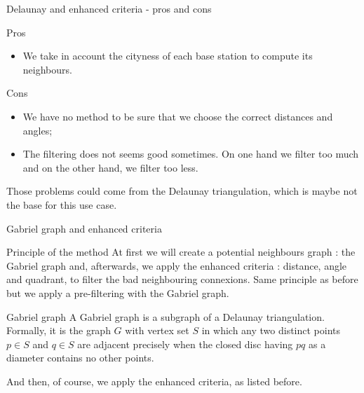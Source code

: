 \begin{frame}{Delaunay and enhanced criteria - pros and cons}
    \begin{block}{Pros}
        \begin{itemize}
            \item We take in account the \og cityness\fg{} of each base station to compute its neighbours.
        \end{itemize}
    \end{block}

    \begin{block}{Cons}
        \begin{itemize}
            \item We have no method to be sure that we choose the correct distances and angles;
            \item The filtering does not seems good sometimes. On one hand we filter too much and on the other hand, we filter too less.
        \end{itemize}
    \end{block}

    Those problems could come from the Delaunay triangulation, which is maybe not the base for this use case.
\end{frame}

\begin{frame}{Gabriel graph and enhanced criteria}
    \begin{block}{Principle of the method}
        At first we will create a potential neighbours graph : the Gabriel graph and, afterwards, we apply the enhanced criteria : distance, angle and quadrant,
        to filter the bad neighbouring connexions. Same principle as before but we apply a pre-filtering with the Gabriel graph.
    \end{block}

    \begin{block}{Gabriel graph\footnotemark}
        A Gabriel graph is a subgraph of a Delaunay triangulation. Formally, it is the graph $G$ with vertex set $S$
        in which any two distinct points $p\in S$ and $q\in S$ are adjacent precisely when the closed disc having $pq$ as a diameter contains no other points.
    \end{block}

    And then, of course, we apply the enhanced criteria, as listed before.

\end{frame}

